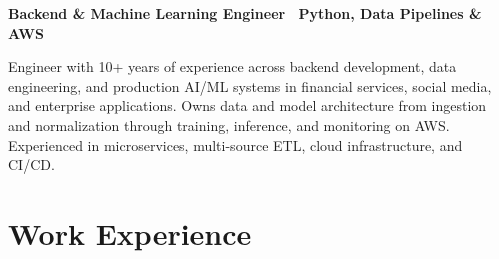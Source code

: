 \documentclass{ExpressiveResume}
\begin{document}
\resumeheader[
    firstname=Eduardo Alejandro Aviles Jimenez,
    email=eduardo.avilesj@gmail.com,
    phone=(+502) 3996-5277,
    linkedin=eduardoavilesj,
    github=steelcolosus,
    state=Guatemala,
    fixobjectivespacing=true
]

\begin{center}
    \textbf{Backend \& Machine Learning Engineer \textbar\ Python, Data Pipelines \& AWS}
\end{center}

\begin{flushleft}
    Engineer with 10+ years of experience across backend development, data engineering, and production AI/ML systems in financial services, social media, and enterprise applications.
    Owns data and model architecture from ingestion and normalization through training, inference, and monitoring on AWS.
    Experienced in microservices, multi-source ETL, cloud infrastructure, and CI/CD.
\end{flushleft}

\section{Work Experience}
\end{document}

